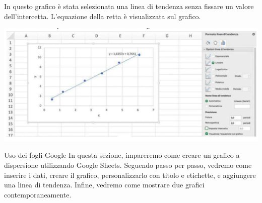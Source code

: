 \documentclass[12pt,a4paper,oneside]{book}
\makeatletter
\newcounter{testexample} %
\renewcommand{\section}{\@startsection{section}{1}{\z@}
{-4ex \@plus -1ex \@minus -.4ex}
{1ex \@plus.2ex }
{\normalfont\large\sffamily\bfseries}}
\theoremstyle{esercizio}
\makeatother
\begin{document}
\begin{testexample}

    In questo grafico è stata selezionata una linea di tendenza senza fissare un valore
    dell'intercetta. L'equazione della retta è visualizzata sul grafico.
    
     \begin{minipage}{\linewidth}
        \centering
        \includegraphics[scale=0.2]{img/linea-tendenza-libre.png} 
        \label{fig:libretendenza}\end{minipage}
    \end{testexample}


\section{Uso dei fogli Google}
In questa sezione, impareremo come creare un grafico a dispersione utilizzando Google Sheets. Seguendo passo per passo, vedremo come inserire i dati, creare il grafico, personalizzarlo con titolo e etichette, e aggiungere una linea di tendenza. Infine, vedremo come mostrare due grafici contemporaneamente.
\end{document}
